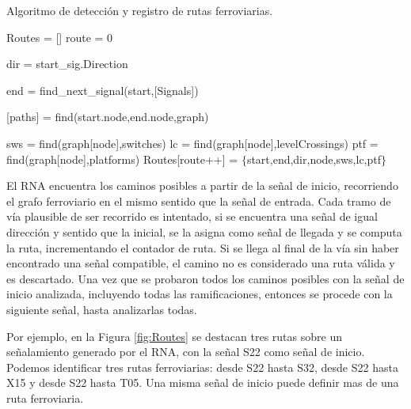 	\begin{algorithm}[H]
        \caption{Algoritmo de detección y registro de rutas ferroviarias.}\label{alg:routes}
        \DontPrintSemicolon
        \SetNoFillComment
        \LinesNotNumbered 
        Routes = []\; 
        route = 0\;
        {
            {
                dir = start\_sig.Direction\;
                
                end = find\_next\_signal(start,[Signals])\;

                [paths] = find(start.node,end.node,graph)\;
                
                {
                    sws = find(graph[node],switches)\;
                    lc = find(graph[node],levelCrossings)\;
                    ptf = find(graph[node],platforms)\;
                    Routes[route++] = $\{$start,end,dir,node,sws,lc,ptf$\}$\;
                }
            }
        }
        \KwResult{[Routes]} 
    \end{algorithm}
        
    El RNA encuentra los caminos posibles a partir de la señal de inicio, recorriendo el grafo ferroviario en el mismo sentido que la señal de entrada. Cada tramo de vía plausible de ser recorrido es intentado, si se encuentra una señal de igual dirección y sentido que la inicial, se la asigna como señal de llegada y se computa la ruta, incrementando el contador de ruta. Si se llega al final de la vía sin haber encontrado una señal compatible, el camino no es considerado una ruta válida y es descartado. Una vez que se probaron todos los caminos posibles con la señal de inicio analizada, incluyendo todas las ramificaciones, entonces se procede con la siguiente señal, hasta analizarlas todas.
    
    Por ejemplo, en la Figura \ref{fig:Routes} se destacan tres rutas sobre un señalamiento generado por el RNA, con la señal S22 como señal de inicio. Podemos identificar tres rutas ferroviarias: desde S22 hasta S32, desde S22 hasta X15 y desde S22 hasta T05. Una misma señal de inicio puede definir mas de una ruta ferroviaria.
    
